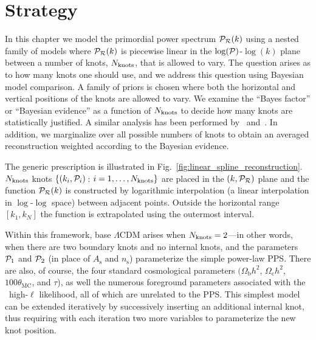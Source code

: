\section{Strategy}
In this chapter we model the primordial power spectrum \(\mathcal{P}_{\mathcal{R}}(k)\) using a nested family of models where \(\mathcal{P}_{\mathcal{R}}(k)\) is piecewise linear in the \(\log (\mathcal{P})\)-\(\log (k)\) plane between a number of knots, \(\Nknots\), that is allowed to vary. The question arises as to how many knots one should use, and we address this question using Bayesian model comparison.  A family of priors is chosen where both the horizontal and vertical positions of the knots are allowed to vary. We examine the ``Bayes factor'' or ``Bayesian evidence'' as a function of \(\Nknots\) to decide how many knots are statistically justified.  A similar analysis has been performed by~\cite{vazquez_knots} and~\cite{knottedsky1}.  In addition, we marginalize over all possible numbers of knots to obtain an averaged reconstruction weighted according to the Bayesian evidence.

The generic prescription is illustrated in Fig.~\ref{fig:linear_spline_reconstruction}. \(\Nknots\) knots \(\{(k_i,\mathcal{P}_{i})\,\): \(i=1,\ldots,N_\mathrm{knots}\}\) are placed in the \((k,\mathcal{P}_{\mathcal{R}})\) plane and the function \(\mathcal{P}_{\mathcal{R}}(k)\) is constructed by logarithmic interpolation (a linear interpolation in \(\log\)-\(\log\) space) between adjacent points.  Outside the horizontal range \([k_1,k_N]\) the function is extrapolated using the outermost interval.

Within this framework, base \(\Lambda\)CDM arises when \({N_\mathrm{knots}=2}\)---in other words, when there are two boundary knots and no internal knots, and the parameters \(\mathcal{P}_{1}\) and \(\mathcal{P}_{2}\) (in place of \(A_\mathrm{s}\) and \(n_\mathrm{s}\)) parameterize the simple power-law PPS\@. There are also, of course, the four standard cosmological parameters \((\Omega_{\mathrm{b}} h^2\), \(\Omega_{\mathrm{c}} h^2\), \(100\theta_{\mathrm{MC}}\), and \(\tau\)), as well the numerous foreground parameters associated with the \Planck\ high-\(\ell\) likelihood, all of which are unrelated to the PPS\@.  This simplest model can be extended iteratively by successively inserting an additional internal knot, thus requiring with each iteration two more variables to parameterize the new knot position.


\begin{table}[tp]
  \centering
  
  \caption{%
    Prior for moveable knot positions.  The \(\PR\) positions are distributed in a log-uniform manner across a wide range.  The \(k\) positions are also log-uniformly distributed across the entire range needed by \CosmoMC{} and are sorted so that \({k_1<\cdots<k_{\Nknots}}\).  When we marginalize over the number of knots, \(\Nknots\), we assume a uniform prior between 2 and 10. }\label{tab:P_k_priors} 
\end{table}

